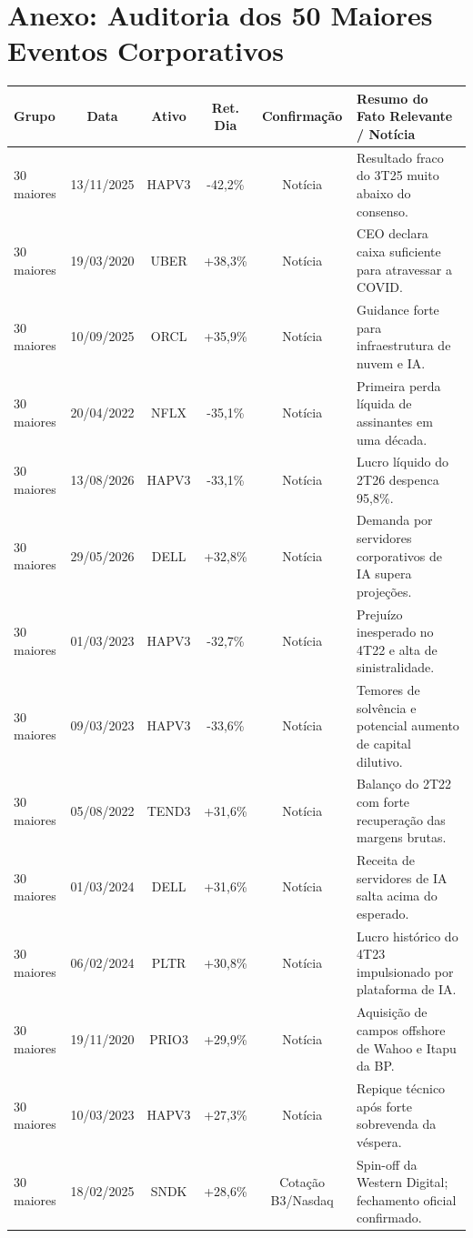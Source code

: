 \documentclass[11pt,a4paper]{article}
\begin{document}
\section{Anexo: Auditoria dos 50 Maiores Eventos Corporativos}

\begin{longtable}{l c c c c p{}}
\toprule
\textbf{Grupo} & \textbf{Data} & \textbf{Ativo} & \textbf{Ret. Dia} & \textbf{Confirmação} & \textbf{Resumo do Fato Relevante / Notícia} \\
\midrule
\endhead
30 maiores & 13/11/2025 & HAPV3 & -42,2\% & Notícia & Resultado fraco do 3T25 muito abaixo do consenso. \\
30 maiores & 19/03/2020 & UBER & +38,3\% & Notícia & CEO declara caixa suficiente para atravessar a COVID. \\
30 maiores & 10/09/2025 & ORCL & +35,9\% & Notícia & Guidance forte para infraestrutura de nuvem e IA. \\
30 maiores & 20/04/2022 & NFLX & -35,1\% & Notícia & Primeira perda líquida de assinantes em uma década. \\
30 maiores & 13/08/2026 & HAPV3 & -33,1\% & Notícia & Lucro líquido do 2T26 despenca 95,8\%. \\
30 maiores & 29/05/2026 & DELL & +32,8\% & Notícia & Demanda por servidores corporativos de IA supera projeções. \\
30 maiores & 01/03/2023 & HAPV3 & -32,7\% & Notícia & Prejuízo inesperado no 4T22 e alta de sinistralidade. \\
30 maiores & 09/03/2023 & HAPV3 & -33,6\% & Notícia & Temores de solvência e potencial aumento de capital dilutivo. \\
30 maiores & 05/08/2022 & TEND3 & +31,6\% & Notícia & Balanço do 2T22 com forte recuperação das margens brutas. \\
30 maiores & 01/03/2024 & DELL & +31,6\% & Notícia & Receita de servidores de IA salta acima do esperado. \\
30 maiores & 06/02/2024 & PLTR & +30,8\% & Notícia & Lucro histórico do 4T23 impulsionado por plataforma de IA. \\
30 maiores & 19/11/2020 & PRIO3 & +29,9\% & Notícia & Aquisição de campos offshore de Wahoo e Itapu da BP. \\
30 maiores & 10/03/2023 & HAPV3 & +27,3\% & Notícia & Repique técnico após forte sobrevenda da véspera. \\
30 maiores & 18/02/2025 & SNDK & +28,6\% & Cotação B3/Nasdaq & Spin-off da Western Digital; fechamento oficial confirmado. \\

\end{longtable}
\end{document}
